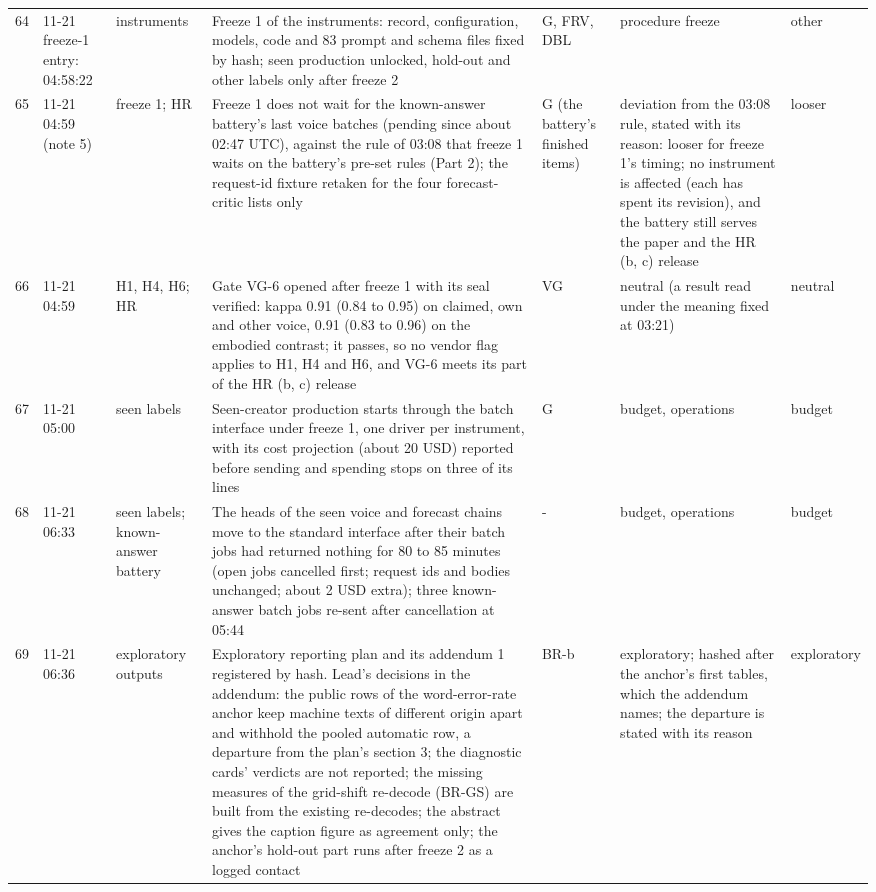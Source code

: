 {\begin{tabular}{@{}rp{}p{}p{}p{}p{}l@{}}
64 & 11-21 freeze-1 entry: 04:58:22 & instruments & Freeze 1 of the instruments: record, configuration, models, code and 83 prompt and schema files fixed by hash; seen production unlocked, hold-out and other labels only after freeze 2 & G, FRV, DBL & procedure freeze & other \\
65 & 11-21 04:59 (note 5) & freeze 1; HR & Freeze 1 does not wait for the known-answer battery's last voice batches (pending since about 02:47 UTC), against the rule of 03:08 that freeze 1 waits on the battery's pre-set rules (Part 2); the request-id fixture retaken for the four forecast-critic lists only & G (the battery's finished items) & deviation from the 03:08 rule, stated with its reason: looser for freeze 1's timing; no instrument is affected (each has spent its revision), and the battery still serves the paper and the HR (b, c) release & looser \\
66 & 11-21 04:59 & H1, H4, H6; HR & Gate VG-6 opened after freeze 1 with its seal verified: kappa 0.91 (0.84 to 0.95) on claimed, own and other voice, 0.91 (0.83 to 0.96) on the embodied contrast; it passes, so no vendor flag applies to H1, H4 and H6, and VG-6 meets its part of the HR (b, c) release & VG & neutral (a result read under the meaning fixed at 03:21) & neutral \\
67 & 11-21 05:00 & seen labels & Seen-creator production starts through the batch interface under freeze 1, one driver per instrument, with its cost projection (about 20 USD) reported before sending and spending stops on three of its lines & G & budget, operations & budget \\
68 & 11-21 06:33 & seen labels; known-answer battery & The heads of the seen voice and forecast chains move to the standard interface after their batch jobs had returned nothing for 80 to 85 minutes (open jobs cancelled first; request ids and bodies unchanged; about 2 USD extra); three known-answer batch jobs re-sent after cancellation at 05:44 & - & budget, operations & budget \\
69 & 11-21 06:36 & exploratory outputs & Exploratory reporting plan and its addendum 1 registered by hash. Lead's decisions in the addendum: the public rows of the word-error-rate anchor keep machine texts of different origin apart and withhold the pooled automatic row, a departure from the plan's section 3; the diagnostic cards' verdicts are not reported; the missing measures of the grid-shift re-decode (BR-GS) are built from the existing re-decodes; the abstract gives the caption figure as agreement only; the anchor's hold-out part runs after freeze 2 as a logged contact & BR-b & exploratory; hashed after the anchor's first tables, which the addendum names; the departure is stated with its reason & exploratory \\
\bottomrule
\end{tabular}}
